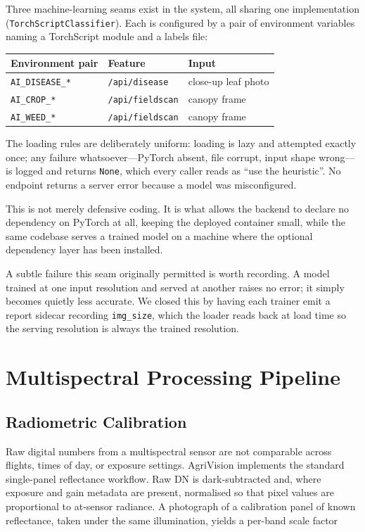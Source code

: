 \documentclass[conference]{IEEEtran}
\begin{document}
Three machine-learning seams exist in the system, all sharing one
implementation (\texttt{TorchScriptClassifier}). Each is configured by a pair of
environment variables naming a TorchScript module and a labels file:

\begin{center}\footnotesize
\begin{tabular}{@{}lll@{}}
\toprule
Environment pair & Feature & Input \\
\midrule
\texttt{AI\_DISEASE\_*} & \texttt{/api/disease} & close-up leaf photo \\
\texttt{AI\_CROP\_*}    & \texttt{/api/fieldscan} & canopy frame \\
\texttt{AI\_WEED\_*}    & \texttt{/api/fieldscan} & canopy frame \\
\bottomrule
\end{tabular}
\end{center}

The loading rules are deliberately uniform: loading is lazy and attempted
exactly once; any failure whatsoever---PyTorch absent, file corrupt, input
shape wrong---is logged and returns \texttt{None}, which every caller reads as
``use the heuristic''. No endpoint returns a server error because a model was
misconfigured.

This is not merely defensive coding. It is what allows the backend to declare
no dependency on PyTorch at all, keeping the deployed container small, while
the same codebase serves a trained model on a machine where the optional
dependency layer has been installed.

A subtle failure this seam originally permitted is worth recording. A model
trained at one input resolution and served at another raises no error; it
simply becomes quietly less accurate. We closed this by having each trainer
emit a report sidecar recording \texttt{img\_size}, which the loader reads back
at load time so the serving resolution is always the trained resolution.

\section{Multispectral Processing Pipeline}

\subsection{Radiometric Calibration}

Raw digital numbers from a multispectral sensor are not comparable across
flights, times of day, or exposure settings. AgriVision implements the standard
single-panel reflectance workflow. Raw DN is dark-subtracted and, where
exposure and gain metadata are present, normalised so that pixel values are
proportional to at-sensor radiance. A photograph of a calibration panel of
known reflectance, taken under the same illumination, yields a per-band scale
factor
\end{document}
